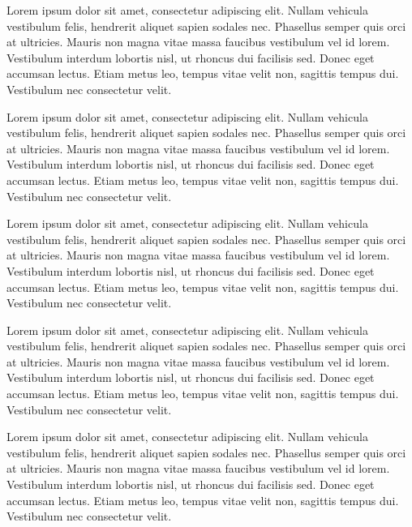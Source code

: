 
Lorem ipsum dolor sit amet, consectetur adipiscing elit. Nullam vehicula vestibulum felis, hendrerit aliquet sapien sodales nec. Phasellus semper quis orci at ultricies. Mauris non magna vitae massa faucibus vestibulum vel id lorem. Vestibulum interdum lobortis nisl, ut rhoncus dui facilisis sed. Donec eget accumsan lectus. Etiam metus leo, tempus vitae velit non, sagittis tempus dui. Vestibulum nec consectetur velit.


Lorem ipsum dolor sit amet, consectetur adipiscing elit. Nullam vehicula vestibulum felis, hendrerit aliquet sapien sodales nec. Phasellus semper quis orci at ultricies. Mauris non magna vitae massa faucibus vestibulum vel id lorem. Vestibulum interdum lobortis nisl, ut rhoncus dui facilisis sed. Donec eget accumsan lectus. Etiam metus leo, tempus vitae velit non, sagittis tempus dui. Vestibulum nec consectetur velit.


Lorem ipsum dolor sit amet, consectetur adipiscing elit. Nullam vehicula vestibulum felis, hendrerit aliquet sapien sodales nec. Phasellus semper quis orci at ultricies. Mauris non magna vitae massa faucibus vestibulum vel id lorem. Vestibulum interdum lobortis nisl, ut rhoncus dui facilisis sed. Donec eget accumsan lectus. Etiam metus leo, tempus vitae velit non, sagittis tempus dui. Vestibulum nec consectetur velit.


Lorem ipsum dolor sit amet, consectetur adipiscing elit. Nullam vehicula vestibulum felis, hendrerit aliquet sapien sodales nec. Phasellus semper quis orci at ultricies. Mauris non magna vitae massa faucibus vestibulum vel id lorem. Vestibulum interdum lobortis nisl, ut rhoncus dui facilisis sed. Donec eget accumsan lectus. Etiam metus leo, tempus vitae velit non, sagittis tempus dui. Vestibulum nec consectetur velit.


Lorem ipsum dolor sit amet, consectetur adipiscing elit. Nullam vehicula vestibulum felis, hendrerit aliquet sapien sodales nec. Phasellus semper quis orci at ultricies. Mauris non magna vitae massa faucibus vestibulum vel id lorem. Vestibulum interdum lobortis nisl, ut rhoncus dui facilisis sed. Donec eget accumsan lectus. Etiam metus leo, tempus vitae velit non, sagittis tempus dui. Vestibulum nec consectetur velit.


